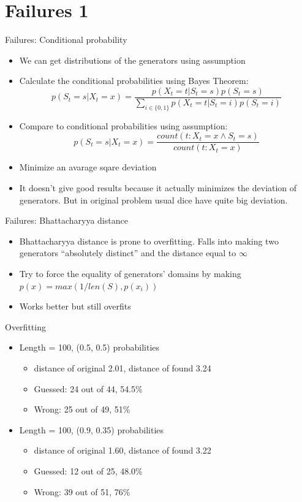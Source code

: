 \documentclass[hyperref=unicode,graphics=pdflatex,13pt]{beamer}
\begin{document}
\section{Failures 1}
\begin{frame}{Failures: Conditional probability}
 \begin{itemize}
  \item We can get distributions of the generators using assumption
  \item Calculate the conditional probabilities using Bayes Theorem:
  $$p(S_t = s | X_t = x) = \frac{p(X_t = t | S_t = s) p(S_t = s)}{\sum_{i \in \{0, 1\}}p(X_t = t | S_t = i) p(S_t = i)}$$
  \item Compare to conditional probabilities using assumption:
  $$p(S_t = s | X_t = x) = \frac{count(t: X_t = x \wedge S_t = s)}{count(t: X_t = x)}$$
  \item Minimize an avarage sqare deviation
  \item It doesn't give good results because it actually minimizes the deviation of generators. But in original problem usual dice have quite big deviation.
 \end{itemize}

\end{frame}

\begin{frame}{Failures: Bhattacharyya distance}
\begin{itemize}
 \item Bhattacharyya distance is prone to overfitting. Falls into making two generators ``absolutely distinct'' and the distance equal to $\infty$
 \item Try to force the equality of generators' domains by making $p(x) = max(1/len(S), p(x_i))$
 \item Works better but still overfits
\end{itemize}
\end{frame}

\begin{frame}{Overfitting}
  \begin{itemize}
   \item Length = 100, (0.5, 0.5) probabilities
   \begin{itemize}
   \item distance of original 2.01, distance of found 3.24
   \item Guessed: 24 out of 44, 54.5\%
   \item Wrong: 25 out of 49, 51\%
   \end{itemize}
  \item Length = 100, (0.9, 0.35) probabilities
  \begin{itemize}
   \item distance of original 1.60, distance of found 3.22
   \item Guessed: 12 out of 25, 48.0\%
   \item Wrong: 39 out of 51, 76\%
  \end{itemize}


  \end{itemize}
\end{frame}
\end{document}
